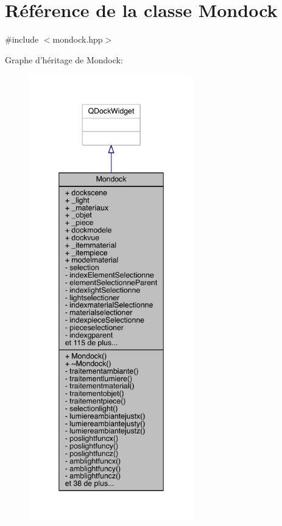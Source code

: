 \hypertarget{class_mondock}{\section{Référence de la classe Mondock}
\label{class_mondock}
}


{\ttfamily \#include $<$mondock.\+hpp$>$}



Graphe d'héritage de Mondock\+:
\nopagebreak
\begin{figure}[H]
\begin{center}
\leavevmode
\includegraphics[height=550pt]{class_mondock__inherit__graph}
\end{center}
\end{figure}


